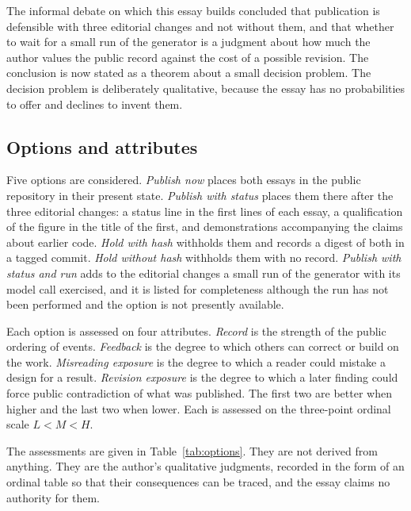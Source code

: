 \documentclass[11pt]{article}
\theoremstyle{plain}
\theoremstyle{definition}
\theoremstyle{remark}
\begin{document}
The informal debate on which this essay builds concluded that publication is defensible with three editorial changes and not without them, and that whether to wait for a small run of the generator is a judgment about how much the author values the public record against the cost of a possible revision. The conclusion is now stated as a theorem about a small decision problem. The decision problem is deliberately qualitative, because the essay has no probabilities to offer and declines to invent them.

\subsection{Options and attributes}

Five options are considered. \emph{Publish now} places both essays in the public repository in their present state. \emph{Publish with status} places them there after the three editorial changes: a status line in the first lines of each essay, a qualification of the figure in the title of the first, and demonstrations accompanying the claims about earlier code. \emph{Hold with hash} withholds them and records a digest of both in a tagged commit. \emph{Hold without hash} withholds them with no record. \emph{Publish with status and run} adds to the editorial changes a small run of the generator with its model call exercised, and it is listed for completeness although the run has not been performed and the option is not presently available.

Each option is assessed on four attributes. \emph{Record} is the strength of the public ordering of events. \emph{Feedback} is the degree to which others can correct or build on the work. \emph{Misreading exposure} is the degree to which a reader could mistake a design for a result. \emph{Revision exposure} is the degree to which a later finding could force public contradiction of what was published. The first two are better when higher and the last two when lower. Each is assessed on the three-point ordinal scale $L<M<H$.

The assessments are given in Table~\ref{tab:options}. They are not derived from anything. They are the author's qualitative judgments, recorded in the form of an ordinal table so that their consequences can be traced, and the essay claims no authority for them.
\end{document}
